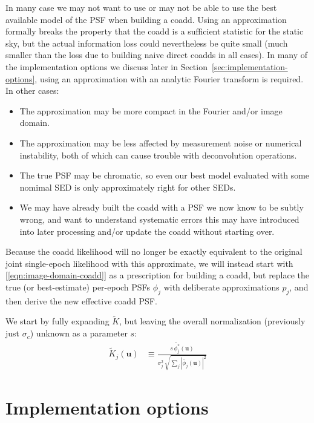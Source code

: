 \documentclass[DM,authoryear,toc]{lsstdoc}
\begin{document}
In many case we may not want to use or may not be able to use the best available model of the PSF when building a coadd.
Using an approximation formally breaks the property that the coadd is a sufficient statistic for the static sky, but the actual information loss could nevertheless be quite small (much smaller than the loss due to building naive direct coadds in all cases).
In many of the implementation options we discuss later in Section~\ref{sec:implementation-options}, using an approximation with an analytic Fourier transform is required.
In other cases:
\begin{itemize}
    \item The approximation may be more compact in the Fourier and/or image domain.
    \item The approximation may be less affected by measurement noise or numerical instability, both of which can cause trouble with deconvolution operations.
    \item The true PSF may be chromatic, so even our best model evaluated with some nomimal SED is only approximately right for other SEDs.
    \item We may have already built the coadd with a PSF we now know to be subtly wrong, and want to understand systematic errors this may have introduced into later processing and/or update the coadd without starting over.
\end{itemize}

Because the coadd likelihood will no longer be exactly equivalent to the original joint single-epoch likelihood with this approximate, we will instead start with [\ref{eqn:image-domain-coadd}] as a prescription for building a coadd, but replace the true (or best-estimate) per-epoch PSFs $\phi_j$ with deliberate approximations $p_j$, and then derive the new effective coadd PSF.

We start by fully expanding $\widetilde{K}$, but leaving the overall normalization (previously just $\sigma_c$) unknown as a parameter $s$:
\begin{align}
    \widetilde{K}_j(\symbf{u}) &\equiv
        \frac{
            s \, \widetilde{\phi_j^\ast}(\symbf{u})
        }{
            \sigma_j^2 \, \sqrt{\sum_j \left|\widetilde{\phi_j}(\symbf{u})\right|^2}
        }
\end{align}


\section{Implementation options}
\end{document}
